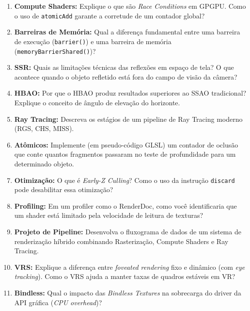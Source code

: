 \begin{enumerate}
    \item \textbf{Compute Shaders:} Explique o que são \textit{Race Conditions} em GPGPU. Como o uso de \texttt{atomicAdd} garante a corretude de um contador global?
    \item \textbf{Barreiras de Memória:} Qual a diferença fundamental entre uma barreira de execução (\texttt{barrier()}) e uma barreira de memória (\texttt{memoryBarrierShared()})?
    \item \textbf{SSR:} Quais as limitações técnicas das reflexões em espaço de tela? O que acontece quando o objeto refletido está fora do campo de visão da câmera?
    \item \textbf{HBAO:} Por que o HBAO produz resultados superiores ao SSAO tradicional? Explique o conceito de ângulo de elevação do horizonte.
    \item \textbf{Ray Tracing:} Descreva os estágios de um pipeline de Ray Tracing moderno (RGS, CHS, MISS).
    \item \textbf{Atômicos:} Implemente (em pseudo-código GLSL) um contador de oclusão que conte quantos fragmentos passaram no teste de profundidade para um determinado objeto.
    \item \textbf{Otimização:} O que é \textit{Early-Z Culling}? Como o uso da instrução \texttt{discard} pode desabilitar essa otimização?
    \item \textbf{Profiling:} Em um profiler como o RenderDoc, como você identificaria que um shader está limitado pela velocidade de leitura de texturas?
    \item \textbf{Projeto de Pipeline:} Desenvolva o fluxograma de dados de um sistema de renderização híbrido combinando Rasterização, Compute Shaders e Ray Tracing.
    \item \textbf{VRS:} Explique a diferença entre \textit{foveated rendering} fixo e dinâmico (com \textit{eye tracking}). Como o VRS ajuda a manter taxas de quadros estáveis em VR?
    \item \textbf{Bindless:} Qual o impacto das \textit{Bindless Textures} na sobrecarga do driver da API gráfica (\textit{CPU overhead})?
\end{enumerate}


